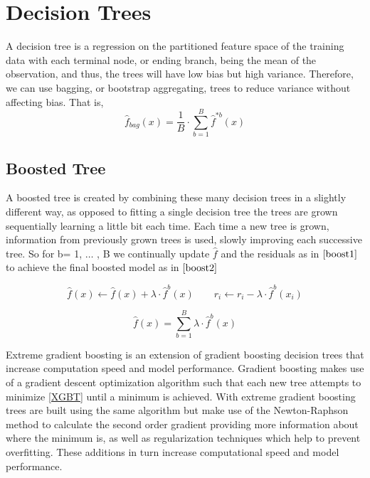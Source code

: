 \documentclass[12pt]{report}
\begin{document}
\section{Decision Trees}

A decision tree is a regression on the partitioned feature space of the training data with each terminal node, or ending branch, being the mean of the observation, and thus, the trees will have low bias but high variance. Therefore, we can use bagging, or bootstrap aggregating, trees to reduce variance without affecting bias. That is,
\begin{equation}
    \hat{f}_{bag}(x) = \frac{1}{B}\cdot\sum^{B}_{b=1}\hat{f}^{*b}(x)
\end{equation}

\subsection{Boosted Tree}
A boosted tree is created by combining these many decision trees in a slightly different way, as opposed to fitting a single decision tree the trees are grown sequentially learning a little bit each time. Each time a new tree is grown, information from previously grown trees is used, slowly improving each successive tree. So for b= 1, $\hdots$ , B we continually update $\hat{f}$ and the residuals as in $\eqref{boost1}$ to achieve the final boosted model as in $\eqref{boost2}$ 

\begin{equation} \label{boost1}
    \hat{f}(x) \leftarrow \hat{f}(x) + \lambda \cdot \hat{f}^{b}(x) \phantom{0000}
    r_{i} \leftarrow r_{i} - \lambda \cdot \hat{f}^{b}(x_{i})
\end{equation}

\begin{equation} \label{boost2}
    \hat{f}(x) = \sum^{B}_{b=1} \lambda \cdot \hat{f}^{b}(x) 
\end{equation}

Extreme gradient boosting is an extension of gradient boosting decision trees that increase computation speed and model performance. Gradient boosting makes use of a gradient descent optimization algorithm such that each new tree attempts to minimize \eqref{XGBT} until a minimum is achieved. With extreme gradient boosting trees are built using the same algorithm but make use of the Newton-Raphson method to calculate the second order gradient providing more information about where the minimum is, as well as regularization techniques which help to prevent overfitting. These additions in turn increase computational speed and model performance. 
\end{document}
